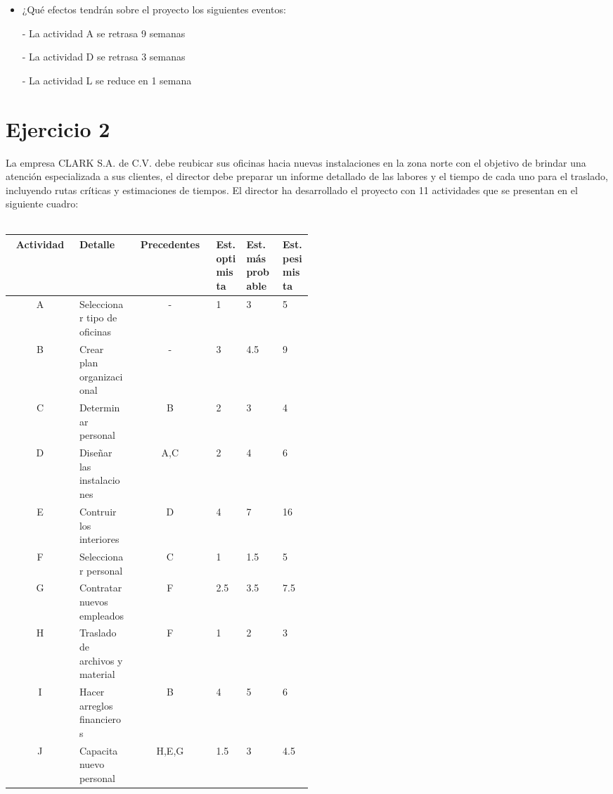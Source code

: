 \documentclass[12pt]{article}
\begin{document}
\begin{itemize}
    \item ¿Qué efectos tendrán sobre el proyecto los siguientes eventos:


    
    - La actividad A se retrasa 9 semanas

    - La actividad D se retrasa 3 semanas

    - La actividad L se reduce en 1 semana

\end{itemize}

\section{Ejercicio 2}

La empresa CLARK S.A. de C.V. debe reubicar sus oficinas hacia nuevas
instalaciones en la zona norte con el objetivo de brindar una atención
especializada a sus clientes, el director debe preparar un informe detallado de
las labores y el tiempo de cada uno para el traslado, incluyendo rutas críticas
y estimaciones de tiempos. El director ha desarrollado el proyecto con 11
actividades que se presentan en el siguiente cuadro: \\
\\
\begin{center}
  \begin{tabular}{cp{0.18\linewidth}cp{0.1\linewidth}p{0.12\linewidth}p{0.1\linewidth}}
    Actividad   &    Detalle    &   Precedentes & Est. optimista  & Est.
    más probable    &   Est. pesimista    \\
    \hline
      A  & Seleccionar tipo de oficinas & -      &  1    &  3   &  5  \\
      B  & Crear plan organizacional    & -      &  3    &  4.5 &  9  \\ 
      C  & Determinar personal          & B      &  2    &  3   &  4  \\ 
      D  & Diseñar las instalaciones    & A,C    &  2    &  4   &  6  \\ 
      E  & Contruir los interiores      & D      &  4    &  7   &  16 \\
      F  & Seleccionar personal         & C      &  1    &  1.5 &  5  \\
      G  & Contratar nuevos empleados   & F      &  2.5  &  3.5 &  7.5\\
      H  & Traslado de archivos y material & F      &  1    &  2   &  3  \\
      I  & Hacer arreglos financieros   & B      &  4    &  5   &  6  \\
      J  & Capacita nuevo personal      & H,E,G  &  1.5  &  3   &  4.5
  \end{tabular}
\end{center}
\end{document}
